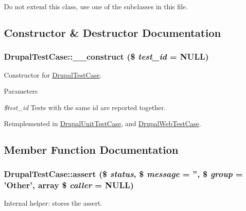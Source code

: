 Do not extend this class, use one of the subclasses in this file. 

\subsection{Constructor \& Destructor Documentation}
\hypertarget{classDrupalTestCase_abb2516192da25b89bec5f5a4a7e91aab}{
\subsubsection[{\_\-\_\-construct}]{\setlength{\rightskip}{0pt plus 5cm}DrupalTestCase::\_\-\_\-construct (\$ {\em test\_\-id} = {\ttfamily NULL})}}
\label{classDrupalTestCase_abb2516192da25b89bec5f5a4a7e91aab}
Constructor for \hyperlink{classDrupalTestCase}{DrupalTestCase}.


\begin{DoxyParams}{Parameters}
\item[{\em \$test\_\-id}]Tests with the same id are reported together. \end{DoxyParams}


Reimplemented in \hyperlink{classDrupalUnitTestCase_a90ea280099eab5b03f4584e04c2b38dc}{DrupalUnitTestCase}, and \hyperlink{classDrupalWebTestCase_a76d165c12dc6042bae017b5c521e6ffa}{DrupalWebTestCase}.

\subsection{Member Function Documentation}
\hypertarget{classDrupalTestCase_ae4722b337aa79fcd753a2fc0c2f0b179}{
\subsubsection[{assert}]{\setlength{\rightskip}{0pt plus 5cm}DrupalTestCase::assert (\$ {\em status}, \/  \$ {\em message} = {\ttfamily ''}, \/  \$ {\em group} = {\ttfamily 'Other'}, \/  array \$ {\em caller} = {\ttfamily NULL})}}
\label{classDrupalTestCase_ae4722b337aa79fcd753a2fc0c2f0b179}
Internal helper: stores the assert.


